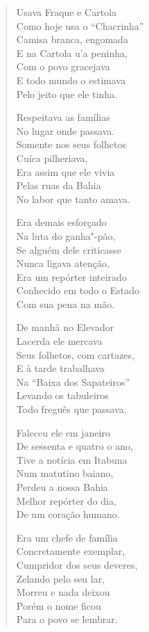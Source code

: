 \begin{verse}
Usava Fraque e Cartola \\
Como hoje usa o ``Chacrinha'' \\
Camisa branca, engomada \\
E na Cartola u'a peninha, \\
Com o povo gracejava \\
E todo mundo o estimava \\
Pelo jeito que ele tinha. 

Respeitava as famílias \\
No lugar onde passava. \\
Somente nos seus folhetos \\
Cuíca pilheriava, \\
Era assim que ele vivia \\
Pelas ruas da Bahia \\
No labor que tanto amava. 

Era demais esforçado \\
Na luta do ganha"-pão, \\
Se alguém dele criticasse \\
Nunca ligava atenção, \\
Era um repórter inteirado \\
Conhecido em todo o Estado \\
Com sua pena na mão. 
\pagebreak

De manhã no Elevador \\
Lacerda ele mercava \\
Seus folhetos, com cartazes, \\
E à tarde trabalhava \\
Na ``Baixa dos Sapateiros'' \\
Levando os tabuleiros \\
Todo freguês que passava. 

Faleceu ele em janeiro \\
De sessenta e quatro o ano, \\
Tive a notícia em Itabuna \\
Num matutino baiano, \\
Perdeu a nossa Bahia \\
Melhor repórter do dia, \\
De um coração humano. 

Era um chefe de família \\
Concretamente exemplar, \\
Cumpridor dos seus deveres, \\
Zelando pelo seu lar, \\
Morreu e nada deixou \\
Porém o nome ficou \\
Para o povo se lembrar. 


\end{verse}
